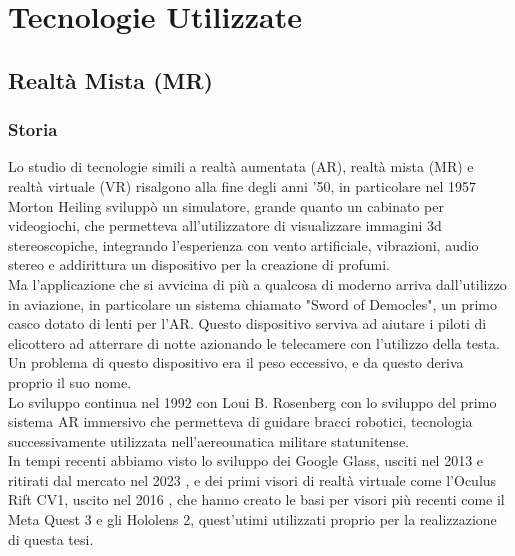 \chapter{Tecnologie Utilizzate}
\pagestyle{plain}


\section{Realtà Mista (MR)}

\subsection{Storia}
Lo studio di tecnologie simili a realtà aumentata (AR), realtà mista (MR) e realtà virtuale (VR) risalgono alla fine degli anni '50, in particolare nel 1957 Morton Heiling sviluppò un simulatore, grande quanto un cabinato per videogiochi, che permetteva all'utilizzatore di visualizzare immagini 3d stereoscopiche, integrando l'esperienza con vento artificiale, vibrazioni, audio stereo e addirittura un dispositivo per la creazione di profumi.\\Ma l'applicazione che si avvicina di più a qualcosa di moderno arriva dall'utilizzo in aviazione, in particolare un sistema chiamato "Sword of Democles", un primo casco dotato di lenti per l'AR. Questo dispositivo serviva ad aiutare i piloti di elicottero ad atterrare di notte azionando le telecamere con l'utilizzo della testa. Un problema di questo dispositivo era il peso eccessivo, e da questo deriva proprio il suo nome. \\ Lo sviluppo continua nel 1992 con Loui B. Rosenberg con lo sviluppo del primo sistema AR immersivo che permetteva di guidare bracci robotici, tecnologia successivamente utilizzata nell'aereounatica militare statunitense. \cite{OverviewofAugmentedReality}
\\ In tempi recenti abbiamo visto lo sviluppo dei Google Glass, usciti nel 2013 e ritirati dal mercato nel 2023 \cite{EndofGoogleGlass}, e dei primi visori di realtà virtuale come l'Oculus Rift CV1, uscito nel 2016 \cite{OculusRift1}, che hanno creato le basi per visori più recenti come il Meta Quest 3 e gli Hololens 2, quest'utimi utilizzati proprio per la realizzazione di questa tesi.


